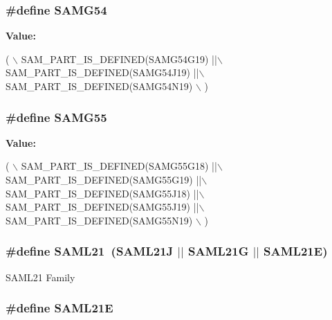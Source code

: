 \hypertarget{group__sam__part__macros__group_ga0cd510d1aac0c983cf19398f7dd2b6a1}{
\subsubsection[{S\-A\-M\-G54}]{\setlength{\rightskip}{0pt plus 5cm}\#define S\-A\-M\-G54}}\label{group__sam__part__macros__group_ga0cd510d1aac0c983cf19398f7dd2b6a1}
{\bfseries Value\-:}
\begin{DoxyCode}
( \(\backslash\)
                SAM\_PART\_IS\_DEFINED(SAMG54G19) ||\(\backslash\)
                SAM\_PART\_IS\_DEFINED(SAMG54J19) ||\(\backslash\)
                SAM\_PART\_IS\_DEFINED(SAMG54N19) \(\backslash\)
                )
\end{DoxyCode}
\hypertarget{group__sam__part__macros__group_ga80c14f26d62169592dd858e259b440de}{
\subsubsection[{S\-A\-M\-G55}]{\setlength{\rightskip}{0pt plus 5cm}\#define S\-A\-M\-G55}}\label{group__sam__part__macros__group_ga80c14f26d62169592dd858e259b440de}
{\bfseries Value\-:}
\begin{DoxyCode}
( \(\backslash\)
                SAM\_PART\_IS\_DEFINED(SAMG55G18) ||\(\backslash\)
                SAM\_PART\_IS\_DEFINED(SAMG55G19) ||\(\backslash\)
                SAM\_PART\_IS\_DEFINED(SAMG55J18) ||\(\backslash\)
                SAM\_PART\_IS\_DEFINED(SAMG55J19) ||\(\backslash\)
                SAM\_PART\_IS\_DEFINED(SAMG55N19) \(\backslash\)
                )
\end{DoxyCode}
\hypertarget{group__sam__part__macros__group_ga38e970d13ac9ee9d74c527ab43bc5c36}{
\subsubsection[{S\-A\-M\-L21}]{\setlength{\rightskip}{0pt plus 5cm}\#define S\-A\-M\-L21~(S\-A\-M\-L21\-J $|$$|$ S\-A\-M\-L21\-G $|$$|$ S\-A\-M\-L21\-E)}}\label{group__sam__part__macros__group_ga38e970d13ac9ee9d74c527ab43bc5c36}
S\-A\-M\-L21 Family \hypertarget{group__sam__part__macros__group_ga77d426bf473440074718db9179864325}{
\subsubsection[{S\-A\-M\-L21\-E}]{\setlength{\rightskip}{0pt plus 5cm}\#define S\-A\-M\-L21\-E}}\label{group__sam__part__macros__group_ga77d426bf473440074718db9179864325}
